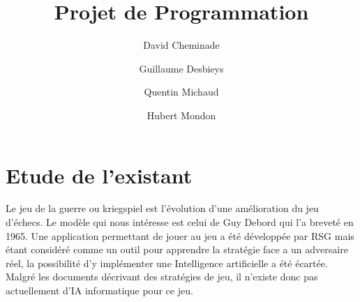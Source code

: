 \documentclass[12pt]{article}
\begin{document}
\title{Projet de Programmation}
\author{David Cheminade\and Guillaume Desbieys\and Quentin Michaud\and Hubert Mondon}

\maketitle

\section{Etude de l'existant}

Le jeu de la guerre ou kriegspiel est l'évolution d'une amélioration du jeu d'échecs.
Le modèle qui nous intéresse est celui de Guy Debord qui l'a breveté en 1965.
Une application permettant de jouer au jeu a été développée par RSG mais étant considéré comme un outil pour apprendre la stratégie face a un adversaire réel, la possibilité d'y implémenter une Intelligence artificielle a été écartée.
Malgré les documents décrivant des stratégies de jeu, il n'existe donc pas actuellement d'IA informatique pour ce jeu.
\end{document}
